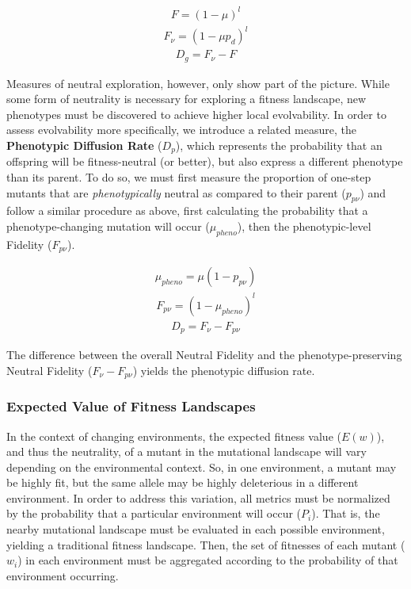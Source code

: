 \documentclass[10pt,letterpaper,final]{article}
\begin{document}
	\begin{eqnarray}
	\label{eq:fidelity}
		F = (1 - \mu)^l
	\end{eqnarray}
	\begin{eqnarray}
	\label{eq:neutral_fidelity}
		F_\nu = (1 - \mu p_d)^l
	\end{eqnarray}
	\begin{eqnarray}
	\label{eq:genomic_diffusion_rate}
		D_g = F_\nu - F
	\end{eqnarray}

Measures of neutral exploration, however, only show part of the picture. While some form of neutrality is necessary for exploring a fitness landscape, new phenotypes must be discovered to achieve higher local evolvability. In order to assess evolvability more specifically, we introduce a related measure, the \textbf{Phenotypic Diffusion Rate} ($D_p$), which represents the probability that an offspring will be fitness-neutral (or better), but also express a different phenotype than its parent. To do so, we must first measure the proportion of one-step mutants that are \textit{phenotypically} neutral as compared to their parent ($p_{p\nu}$) and follow a similar procedure as above, first calculating the probability that a phenotype-changing mutation will occur ($\mu_{pheno}$), then the phenotypic-level Fidelity ($F_{p\nu}$).

	\begin{eqnarray}
	\label{eq:phenotypic_mutation_rate}
		\mu_{pheno} = \mu (1- p_{p\nu})
	\end{eqnarray}
	\begin{eqnarray}
	\label{eq:phenotypic_fidelity}
		F_{p\nu} = (1 - \mu_{pheno})^l
	\end{eqnarray}
	\begin{eqnarray}
	\label{eq:phenotypic_diffusion_rate}
		D_p = F_\nu - F_{p\nu}
	\end{eqnarray}

The difference between the overall Neutral Fidelity and the phenotype-preserving Neutral Fidelity ($F_\nu - F_{p\nu}$) yields the phenotypic diffusion rate.

\subsubsection*{Expected Value of Fitness Landscapes}
In the context of changing environments, the expected fitness value ($E(w)$), and thus the neutrality, of a mutant in the mutational landscape will vary depending on the environmental context. So, in one environment, a mutant may be highly fit, but the same allele may be highly deleterious in a different environment. In order to address this variation, all metrics must be normalized by the probability that a particular environment will occur ($P_i$). That is, the nearby mutational landscape must be evaluated in each possible environment, yielding a traditional fitness landscape. Then, the set of fitnesses of each mutant ($w_i$) in each environment must be aggregated according to the probability of that environment occurring.
\end{document}
